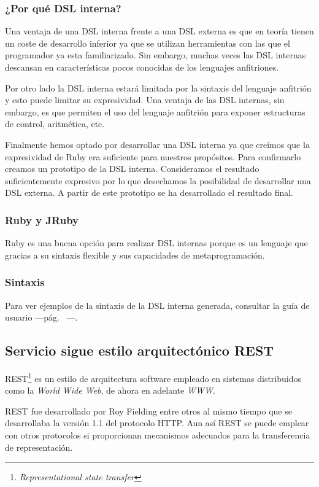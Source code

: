 \subsubsection{¿Por qué DSL interna?}

Una ventaja de una DSL interna frente a una DSL externa es que en
teoría tienen un coste de desarrollo inferior ya que se utilizan
herramientas con las que el programador ya esta familiarizado. Sin
embargo, muchas veces las DSL internas descansan en características
pocos conocidas de los lenguajes anfitriones.

Por otro lado la DSL interna estará limitada por la sintaxis del
lenguaje anfitrión y esto puede limitar su expresividad. Una ventaja
de las DSL internas, sin embargo, es que permiten el uso del lenguaje
anfitrión para exponer estructuras de control, aritmética, etc.

Finalmente hemos optado por desarrollar una DSL interna ya que creímos
que la expresividad de Ruby era suficiente para nuestros
propósitos. Para confirmarlo creamos un prototipo de la DSL
interna. Consideramos el resultado suficientemente expresivo por lo
que desechamos la posibilidad de desarrollar una DSL externa. A partir
de este prototipo se ha desarrollado el resultado final.

\subsubsection{Ruby y JRuby}
Ruby es una buena opción para realizar DSL internas porque es un
lenguaje que gracias a su sintaxis flexible y sus capacidades de
metaprogramación.
\subsubsection{Sintaxis}

Para ver ejemplos de la sintaxis de la DSL interna generada, consultar
la guía de usuario ---pág.~\pageref{user_guide} ---.

\subsection{Servicio sigue estilo arquitectónico REST}
REST\footnote{\emph{Representational state transfer}} es un estilo de
arquitectura software empleado en sistemas distribuidos como la
\emph{World Wide Web}, de ahora en adelante \emph{WWW}.

REST fue desarrollado por Roy Fielding entre otros al mismo tiempo que
se desarrollaba la versión 1.1 del protocolo HTTP. Aun así REST se
puede emplear con otros protocolos si proporcionan mecanismos
adecuados para la transferencia de representación.

